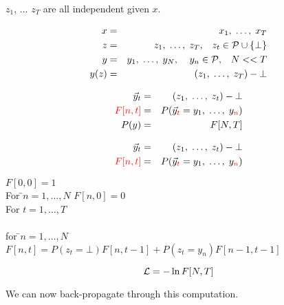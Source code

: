 {\vfill
$z_1$, $\ldots$ $z_T$ are {\color{red}  all independent} given $x$.


\begin{eqnarray*}
  x & = & x_1,\;\ldots,\; x_T \\
  z & = & z_1, \;\ldots,\;z_T,\;\;\;z_t \in {\cal P}\cup \{\bot\} \\
  y & = & y_1,\;\ldots,\;y_N,\;\;\;\;y_n \in {\cal P},\;\;\;N << T \\
  y(z) & = & (z_1,\;\ldots,\;z_T) - \bot
\end{eqnarray*}

\vfill

\begin{eqnarray*}
  \vec{y}_t & = & (z_1,\;\ldots,\;z_t)-\bot \\
  {\color{red} F[n,t]} & = & P(\vec{y}_{\color{red} t} = y_1,\;\ldots,\;y_{\color{red} n}) \\
  P(y) & = & F[N,T]
\end{eqnarray*}


\begin{eqnarray*}
  \vec{y}_t & = & (z_1,\;\ldots,\;z_t)-\bot \\
  {\color{red} F[n,t]} & = & P(\vec{y}_{\color{red} t} = y_1,\;\ldots,\;y_{\color{red} n})
\end{eqnarray*}

\vfill
\begin{tabbing}
  {\color{red} $F[0,0] = 1$} \\
  For \=$n = 1,\ldots,N$ {\color{red} $F[n,0] = 0$} \\
  For \>$t = 1,\dots,T$ \\
       \\
      \> for \=$n = 1,\ldots, N$ \\
      \>     \> {\color{red} $F[n,t] = P(z_t = \bot) F[n,t-1] + P(z_t = y_n)F[n-1,t-1]$}
\end{tabbing}


{\color{red} $${\cal L} = - \ln F[N,T]$$}

We can now back-propagate through this computation.

}


